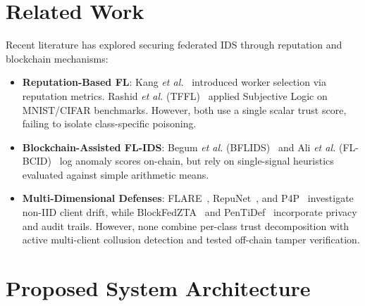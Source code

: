 \documentclass[conference]{IEEEtran}
\begin{document}
\section{Related Work}
Recent literature has explored securing federated IDS through reputation and blockchain mechanisms:
\begin{itemize}
    \item \textbf{Reputation-Based FL}: Kang \emph{et al.}~\cite{kang2020reputation} introduced worker selection via reputation metrics. Rashid \emph{et al.} (TFFL)~\cite{rashid2025tffl} applied Subjective Logic on MNIST/CIFAR benchmarks. However, both use a single scalar trust score, failing to isolate class-specific poisoning.
    \item \textbf{Blockchain-Assisted FL-IDS}: Begum \emph{et al.} (BFLIDS)~\cite{begum2024bflids} and Ali \emph{et al.} (FL-BCID)~\cite{ali2025flbcid} log anomaly scores on-chain, but rely on single-signal heuristics evaluated against simple arithmetic means.
    \item \textbf{Multi-Dimensional Defenses}: FLARE~\cite{flare2025}, RepuNet~\cite{repunet2025}, and P4P~\cite{p4p2026} investigate non-IID client drift, while BlockFedZTA~\cite{blockfedzta2026} and PenTiDef~\cite{pentidef2026} incorporate privacy and audit trails. However, none combine per-class trust decomposition with active multi-client collusion detection and tested off-chain tamper verification.
\end{itemize}

\section{Proposed System Architecture}
\end{document}
